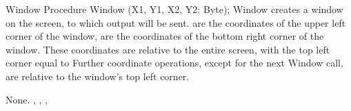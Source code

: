  
\begin{procedure}{Window}
\Declaration
Procedure Window (X1, Y1, X2, Y2: Byte);
\Description
 Window creates a window on the screen, to which output will be sent.
 are the coordinates of the upper left corner of the window,
 are the coordinates of the bottom right corner of the window.
These coordinates are relative to the entire screen, with the top left
corner equal to 
Further coordinate operations, except for the next Window call,
are relative to the window's top left corner.

\Errors
None.
\SeeAlso
{}, , , 
\end{procedure}



